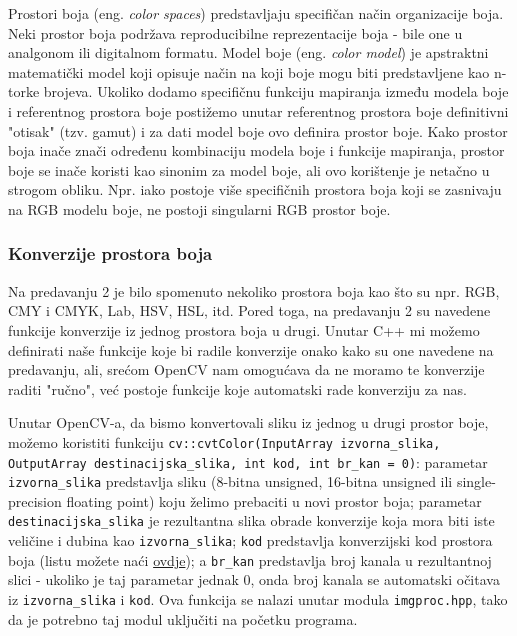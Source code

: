 \documentclass[a4paper, 12pt]{article}
\begin{document}
Prostori boja (eng. \textit{color spaces}) predstavljaju specifičan način organizacije boja. Neki prostor boja podržava reproducibilne reprezentacije boja - bile one u analgonom ili digitalnom formatu. Model boje (eng. \textit{color model}) je apstraktni matematički model koji opisuje način na koji boje mogu biti predstavljene kao n-torke brojeva. Ukoliko dodamo specifičnu funkciju mapiranja između modela boje i referentnog prostora boje postižemo unutar referentnog prostora boje definitivni "otisak" (tzv. gamut) i za dati model boje ovo definira prostor boje. Kako prostor boja inače znači određenu kombinaciju modela boje i funkcije mapiranja, prostor boje se inače koristi kao sinonim za model boje, ali ovo korištenje je netačno u strogom obliku. Npr. iako postoje više specifičnih prostora boja koji se zasnivaju na RGB modelu boje, ne postoji singularni RGB prostor boje.

\subsubsection*{Konverzije prostora boja}

Na predavanju 2 je bilo spomenuto nekoliko prostora boja kao što su npr. RGB, CMY i CMYK, Lab, HSV, HSL, itd. Pored toga, na predavanju 2 su navedene funkcije konverzije iz jednog prostora boja u drugi. Unutar C++ mi možemo definirati naše funkcije koje bi radile konverzije onako kako su one navedene na predavanju, ali, srećom OpenCV nam omogućava da ne moramo te konverzije raditi "ručno", već postoje funkcije koje automatski rade konverziju za nas. 

Unutar OpenCV-a, da bismo konvertovali sliku iz jednog u drugi prostor boje, možemo koristiti funkciju \lstinline{cv::cvtColor(InputArray izvorna_slika, OutputArray destinacijska_slika, int kod, int br_kan = 0)}: parametar \lstinline{izvorna_slika} predstavlja sliku (8-bitna unsigned, 16-bitna unsigned ili single-precision floating point) koju želimo prebaciti u novi prostor boja; parametar \lstinline{destinacijska_slika} je rezultantna slika obrade konverzije koja mora biti iste veličine i dubina kao \lstinline{izvorna_slika}; \lstinline{kod} predstavlja konverzijski kod prostora boja (listu možete naći \href{https://docs.opencv.org/3.4/d8/d01/group__imgproc__color__conversions.html}{ovdje}); a \lstinline{br_kan} predstavlja broj kanala u rezultantnoj slici - ukoliko je taj parametar jednak 0, onda broj kanala se automatski očitava iz \lstinline{izvorna_slika} i \lstinline{kod}. Ova funkcija se nalazi unutar modula \lstinline{imgproc.hpp}, tako da je potrebno taj modul uključiti na početku programa.
\end{document}
